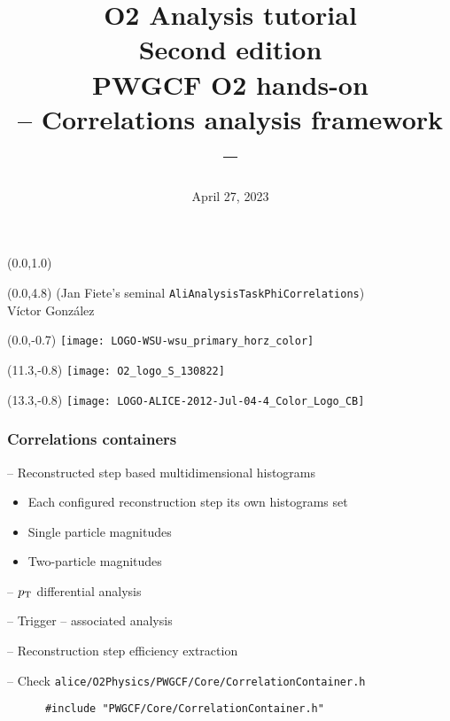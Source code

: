 \documentclass[14pt,aspectratio=169,t]{beamer}
\title{\texorpdfstring{O2 Analysis tutorial\\Second edition\\
        PWGCF O2 hands-on\\-- Correlations analysis framework --}{}}
\date{April 27, 2023}
\begin{document}

\begin{frame}
    \begin{textblock}{14}(0.0,1.0)
        \titlepage
    \end{textblock}
    
    \begin{textblock}{14}(0.0,4.8)
        \centering
        {\color{blue}\small (Jan Fiete's seminal \texttt{AliAnalysisTaskPhiCorrelations})}\\
        \vspace{0.3in}Víctor González
    \end{textblock}
    \begin{textblock}{12}(0.0,-0.7)
        \texttt{[image: LOGO-WSU-wsu\_primary\_horz\_color]}
    \end{textblock}
    \begin{textblock}{10}(11.3,-0.8)
        \texttt{[image: O2\_logo\_S\_130822]}
    \end{textblock}
    \begin{textblock}{10}(13.3,-0.8)
        \texttt{[image: LOGO-ALICE-2012-Jul-04-4\_Color\_Logo\_CB]}
    \end{textblock}
\end{frame}

\begin{frame}[fragile]
  \frametitle{Correlations containers}
  -- {\color{blue}Reconstructed step based multidimensional histograms}
  \begin{itemize}
    \item Each configured reconstruction step its own histograms set 
    \item Single particle magnitudes
    \item Two-particle magnitudes
  \end{itemize}
  \vspace{0.1in}
  -- {\color{blue}$p_{\rm T}$ differential analysis}\par
  \vspace{0.1in}
  -- {\color{blue}Trigger -- associated analysis}\par
  \vspace{0.1in}
  -- {\color{blue}Reconstruction step efficiency extraction}\par
  \vspace{0.1in}
  -- {\color{blue}Check} {\small \verb|alice/O2Physics/PWGCF/Core/CorrelationContainer.h|}\par
  \vspace{0.1in}
  {\small\color{blue}
  \begin{verbatim}
      #include "PWGCF/Core/CorrelationContainer.h"
  \end{verbatim}}
\end{frame}
\end{document}
